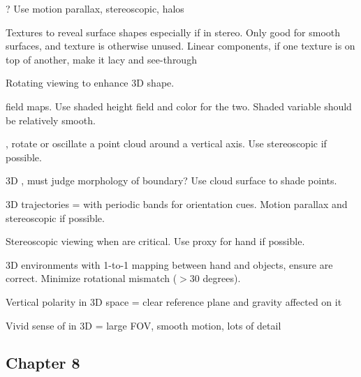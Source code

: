 \begin{compactenum}
\item {}? Use motion parallax, stereoscopic, halos

\item Textures to reveal surface shapes especially if in stereo. Only good for
    smooth surfaces, and texture is otherwise unused. Linear components, if
    one texture is on top of another, make it lacy and see-through

\item Rotating  viewing to enhance 3D shape.

\item {} field maps. Use shaded height field and color for
    the two. Shaded variable should be relatively smooth.

\item {}, rotate or oscillate a point cloud around a
    vertical axis. Use stereoscopic if possible.

\item 3D , must judge morphology of boundary? Use cloud surface
    to shade points.

\item 3D trajectories =  with periodic bands for orientation
    cues. Motion parallax and stereoscopic if possible.

\item Stereoscopic viewing when  are critical. Use proxy for
    hand if possible.

\item 3D environments with 1-to-1 mapping between hand and objects, ensure
     are correct. Minimize rotational mismatch
    ($>30$ degrees).

\item Vertical polarity in 3D space = clear reference  plane and
    gravity affected  on it

\item Vivid sense of  in 3D = large FOV, smooth motion, lots of detail

\end{compactenum}




\subsection{Chapter 8}

